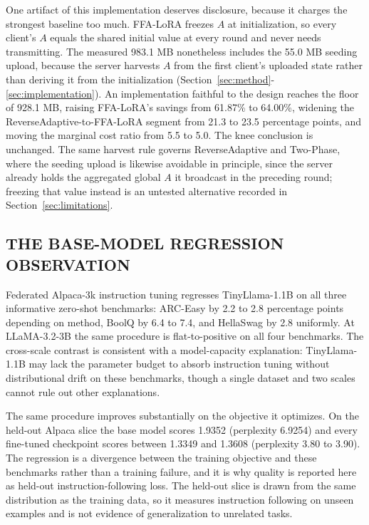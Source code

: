 One artifact of this implementation deserves disclosure, because it charges the strongest baseline too much. FFA-LoRA freezes $A$ at initialization, so every client's $A$ equals the shared initial value at every round and never needs transmitting. The measured 983.1 MB nonetheless includes the 55.0 MB seeding upload, because the server harvests $A$ from the first client's uploaded state rather than deriving it from the initialization (Section~\ref{sec:method}-\ref{sec:implementation}). An implementation faithful to the design reaches the floor of 928.1 MB, raising FFA-LoRA's savings from 61.87\% to 64.00\%, widening the ReverseAdaptive-to-FFA-LoRA segment from 21.3 to 23.5 percentage points, and moving the marginal cost ratio from 5.5 to 5.0. The knee conclusion is unchanged. The same harvest rule governs ReverseAdaptive and Two-Phase, where the seeding upload is likewise avoidable in principle, since the server already holds the aggregated global $A$ it broadcast in the preceding round; freezing that value instead is an untested alternative recorded in Section~\ref{sec:limitations}.

\subsection{THE BASE-MODEL REGRESSION OBSERVATION}
\label{sec:baseregression}
Federated Alpaca-3k \cite{taori2023alpaca} instruction tuning regresses TinyLlama-1.1B \cite{zhang2024tinyllama} on all three informative zero-shot benchmarks: ARC-Easy by 2.2 to 2.8 percentage points depending on method, BoolQ by 6.4 to 7.4, and HellaSwag by 2.8 uniformly. At LLaMA-3.2-3B \cite{dubey2024llama3} the same procedure is flat-to-positive on all four benchmarks. The cross-scale contrast is consistent with a model-capacity explanation: TinyLlama-1.1B may lack the parameter budget to absorb instruction tuning without distributional drift on these benchmarks, though a single dataset and two scales cannot rule out other explanations.

The same procedure improves substantially on the objective it optimizes. On the held-out Alpaca slice the base model scores 1.9352 (perplexity 6.9254) and every fine-tuned checkpoint scores between 1.3349 and 1.3608 (perplexity 3.80 to 3.90). The regression is a divergence between the training objective and these benchmarks rather than a training failure, and it is why quality is reported here as held-out instruction-following loss. The held-out slice is drawn from the same distribution as the training data, so it measures instruction following on unseen examples and is not evidence of generalization to unrelated tasks.

